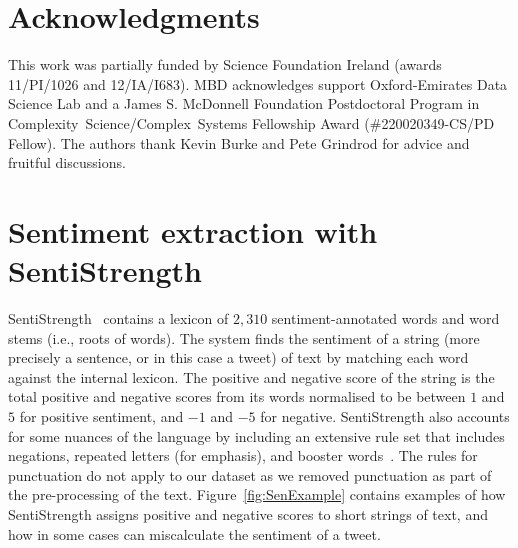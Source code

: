 \documentclass{article}
\begin{document}
\section*{Acknowledgments}
This work was partially funded by Science Foundation Ireland (awards
11/PI/1026 and 12/IA/I683). MBD acknowledges support Oxford-Emirates
Data Science Lab and a James S. McDonnell Foundation Postdoctoral
Program in Complexity~Science/Complex~Systems Fellowship Award
(\#220020349-CS/PD Fellow). The authors thank Kevin Burke and Pete
Grindrod for advice and fruitful discussions.




\appendix


\setcounter{figure}{0}
\makeatletter 
\renewcommand{\thefigure}{S\@arabic\c@figure}
\makeatother


\setcounter{table}{0}
\makeatletter 
\renewcommand{\thetable}{S\@arabic\c@table}
\makeatother



\section{Sentiment extraction with SentiStrength}
\label{app:SentiExample}

SentiStrength~\cite{Thelwall2013SentiStrHeart} contains a lexicon of
$2,310$ sentiment-annotated words and word stems (i.e., roots of
words). The system finds the sentiment of a string (more precisely a
sentence, or in this case a tweet) of text by matching each word
against the internal lexicon. The positive and negative score of the
string is the total positive and negative scores from its words
normalised to be between $1$ and $5$ for positive sentiment, and $-1$
and $-5$ for negative.  SentiStrength also accounts for some nuances
of the language by including an extensive rule set that includes
negations, repeated letters (for emphasis), and booster
words~\cite{Thelwall2013SentiStrHeart}. The rules for punctuation do
not apply to our dataset as we removed punctuation as part of the
pre-processing of the text.  Figure~\ref{fig:SenExample} contains
examples of how SentiStrength assigns positive and negative scores to
short strings of text, and how in some cases can miscalculate the
sentiment of a tweet.
\end{document}
